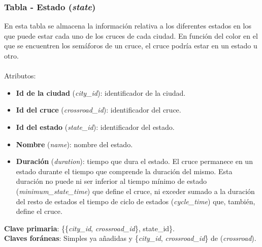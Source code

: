 \subsubsection{Tabla - Estado (\textit{state})}
En esta tabla se almacena la información relativa a los diferentes estados en los que puede estar cada uno de los cruces de cada ciudad. En función del color en el que se encuentren los semáforos de un cruce, el cruce podría estar en un estado u otro. \\\\
Atributos:
\begin{itemize}
    \item \textbf{Id de la ciudad} (\textit{city\_id}): identificador de la ciudad.
    \item \textbf{Id del cruce} (\textit{crossroad\_id}): identificador del cruce.
    \item \textbf{Id del estado} (\textit{state\_id}): identificador del estado.
    \item \textbf{Nombre} (\textit{name}): nombre del estado.
    \item \textbf{Duración} (\textit{duration}): tiempo que dura el estado. El cruce permanece en un estado durante el tiempo que comprende la duración del mismo. Esta duración no puede ni ser inferior al tiempo mínimo de estado (\textit{minimum\_state\_time}) que define el cruce, ni exceder sumado a la duración del resto de estados el tiempo de ciclo de estados (\textit{cycle\_time}) que, también, define el cruce. 
\end{itemize}
\textbf{Clave primaria}: \{\{\textit{city\_id}, \textit{crossroad\_id}\}, {state\_id}\}. \\
\textbf{Claves foráneas}: Simples ya añadidas y \{\textit{city\_id}, \textit{crossroad\_id}\} de (\textit{crossroad}).

